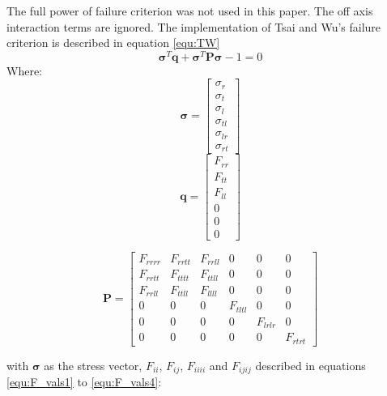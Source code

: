 \documentclass[10pt]{article}
\begin{document}
The full power of \citet{tsai_general_1971} failure criterion was not used in this paper. The off axis interaction terms are ignored. The implementation of Tsai and Wu's failure criterion is described in equation \ref{equ:TW}
\begin{equation}\label{equ:TW}
\boldsymbol{\sigma}^T\boldsymbol{q} + \boldsymbol{\sigma}^T\boldsymbol{P\sigma} -1 = 0
\end{equation}
Where:
\begin{equation}\label{equ:stress_vec}
\boldsymbol{\sigma}=\begin{bmatrix}
	\sigma_{r}\\
	\sigma_{t}\\
	\sigma_{l}\\
	\sigma_{tl}\\
	\sigma_{lr}\\
	\sigma_{rt}
	\end{bmatrix}
\end{equation}
\hspace{0.2cm}
\begin{equation}\label{equ:q_vec}
\boldsymbol{q}=\begin{bmatrix}
	F_{rr}\\
	F_{tt}\\
	F_{ll}\\
	0\\
	0\\
	0
	\end{bmatrix}
\end{equation}

\begin{equation}\label{equ:P_mat}
\boldsymbol{P}=\begin{bmatrix}
	F_{rrrr}&F_{rrtt}&F_{rrll}&0&0&0\\
	F_{rrtt}&F_{tttt}&F_{ttll}&0&0&0\\
	F_{rrll}&F_{ttll}&F_{llll}&0&0&0\\
	0&0&0&F_{tltl}&0&0\\
	0&0&0&0&F_{lrlr}&0\\
	0&0&0&0&0&F_{rtrt}
	\end{bmatrix}
\end{equation}

with \(\boldsymbol{\sigma}\) as the stress vector, \(F_{ii}\), \(F_{ij}\), \(F_{iiii}\) and \(F_{ijij}\) described in equations \ref{equ:F_vals1} to \ref{equ:F_vals4}:
\end{document}
